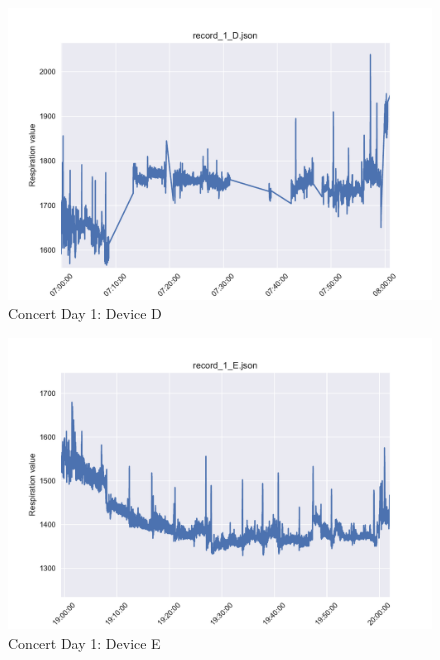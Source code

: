 \begin{figure}
    \centering
    \includegraphics[scale=0.6]{images/record_1_d.pdf}
    \caption{Concert Day 1: Device D}
    \label{fig:concert_day1_d}
\end{figure}

\begin{figure}
    \centering
    \includegraphics[scale=0.6]{images/record_1_e.pdf}
    \caption{Concert Day 1: Device E}
    \label{fig:concert_day1_e}
\end{figure}

